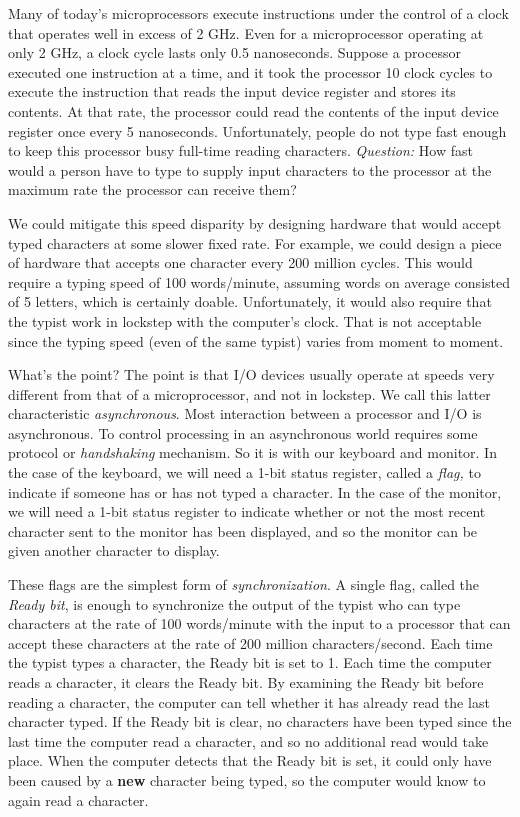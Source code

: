 \documentclass{patt}
\begin{document}
Many of today's microprocessors execute instructions under the control
of a clock that operates well in excess of 2 GHz.  Even for a
microprocessor operating at only 2 GHz, a clock cycle lasts only 0.5
nanoseconds.  Suppose a processor executed one instruction at a time,
and it took the processor 10 clock cycles to execute the instruction
that reads the input device register and stores its contents.  At that
rate, the processor could read the contents of the input device
register once every 5 nanoseconds.  Unfortunately, people do not type
fast enough to keep this processor busy full-time reading characters.
{\em Question:} How fast would a person have to type to supply input
characters to the processor at the maximum rate the processor can
receive them? 

We could mitigate this speed disparity by designing hardware that
would accept typed characters at some slower fixed rate.  For example,
we could design a piece of hardware that accepts one character every
200 million cycles. This would require a typing speed of 100
words/minute, assuming words on average consisted of 5 letters, which is 
certainly doable.  Unfortunately, it would also require that the typist 
work in lockstep with the computer's clock.  That is not acceptable 
since the typing speed (even of the same typist) varies from moment to moment.

What's the point?  The point is that I/O devices usually operate at
speeds very different from that of a microprocessor, and not in
lockstep.  We call this latter characteristic  {\em asynchronous}.
Most interaction between a processor  and I/O
is asynchronous. To control processing in an asynchronous world
requires some protocol or {\em handshaking} 
 mechanism.  So it is with our keyboard and monitor.
In the case of the keyboard, we will need a 1-bit status
register, called a {\em flag,} to indicate if someone has or has not
typed a character.  In the case of the monitor, we will need a 1-bit
status register to indicate whether or not the most recent character
sent to the monitor has been displayed, and so the monitor can be given
another character to display.

These flags are the simplest form of {\em synchronization}.  A single
 flag, called the {\em Ready bit}, is enough to
synchronize the output of the typist who can type characters at the
rate of 100 words/minute with the input to a processor that can accept
these characters at the rate of 200 million characters/second.  Each
time the typist types a character, the Ready bit is set to 1. Each time the
computer reads a character, it clears the Ready bit.  By examining the
Ready bit before reading a character, the computer can tell whether it
has already read the last character typed.  If the Ready bit is clear,
no characters have been typed since the last time the computer read a
character, and so no additional read would take place. When the
computer detects that the Ready bit is set, it could only have been
caused by a {\bf new} character being typed, so the computer would
know to again read a character.
\end{document}
